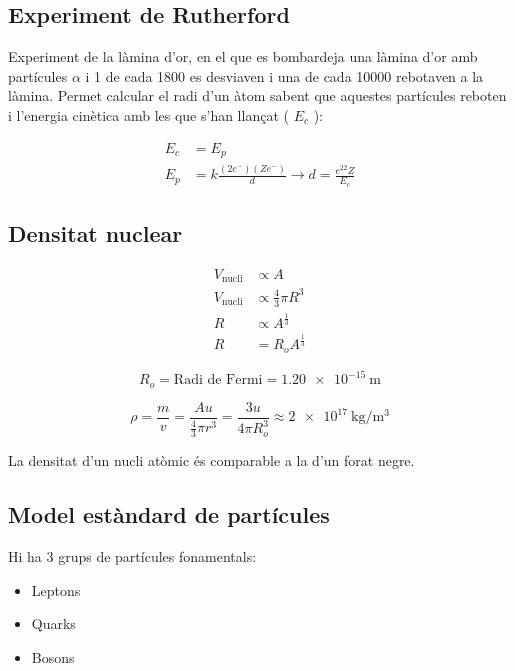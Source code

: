 \subsection{Experiment de Rutherford}
\label{sub:experiment_de_rutherford}

Experiment de la làmina d'or, en el que es bombardeja una làmina d'or amb
partícules $\alpha$ i 1 de cada 1800 es desviaven i una de cada 10000 rebotaven
a la làmina.  Permet calcular el radi d'un àtom sabent que aquestes partícules
reboten i l'energia cinètica amb les que s'han llançat ( $E_c$ ):

\begin{align}
    E_c &= E_p \nonumber \\
    E_p &= k\frac{(2e^-)(Ze^-)}{d} \rightarrow d = \frac{e^22Z}{E_c}
\end{align}

\subsection{Densitat nuclear}
\label{sub:densitat_nuclear}

\begin{align}
    V_{\text{nucli}} &\propto A \\
    V_{\text{nucli}} &\propto \frac{4}{3}\pi R^3 \\
    R &\propto A^{\frac{1}{3}} \\
    R &= R_oA^{\frac{1}{3}}
\end{align}

\begin{equation}
    R_o = \text{Radi de Fermi} = \SI{1,20e-15}{\meter}
\end{equation}

\begin{equation}
    \rho = \frac{m}{v} = \frac{Au}{\frac{4}{3}\pi r^3} = \frac{3u}{4\pi R_o^3} \approx \SI{2e17}{\kilo\gram\per\metre\cubed}
\end{equation}

La densitat d'un nucli atòmic és comparable a la d'un forat negre.

\subsection{Model estàndard de partícules}
\label{sub:model_estandard_de_particules}

Hi ha 3 grups de partícules fonamentals:

\begin{itemize}
    \item Leptons
    \item Quarks
    \item Bosons
\end{itemize}

